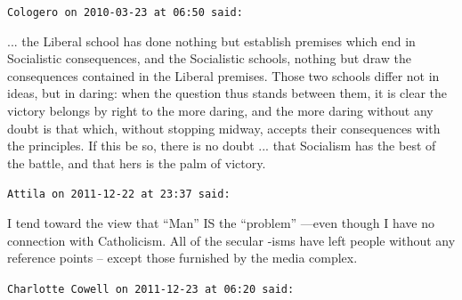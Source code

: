 \begin{footnotesize}
\begin{sffamily}
\texttt{Cologero on 2010-03-23 at 06:50 said:}

\begin{quotex}\small
... the Liberal school has done nothing but establish premises which end in Socialistic consequences, and the Socialistic schools, nothing but draw the consequences contained in the Liberal premises. Those two schools differ not in ideas, but in daring: when the question thus stands between them, it is clear the victory belongs by right to the more daring, and the more daring without any doubt is that which, without stopping midway, accepts their consequences with the principles. If this be so, there is no doubt ... that Socialism has the best of the battle, and that hers is the palm of victory.

\end{quotex}

\hfill

\texttt{Attila on 2011-12-22 at 23:37 said:}

I tend toward the view that ``Man'' IS the ``problem'' ---even though I have no connection with Catholicism. All of the secular -isms have left people without any reference points -- except those furnished by the media complex.

\hfill

\texttt{Charlotte Cowell on 2011-12-23 at 06:20 said:}


\end{sffamily}
\end{footnotesize}
